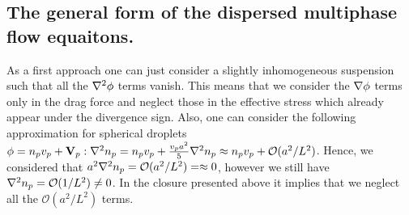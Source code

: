 \subsection{The general form of the dispersed multiphase flow equaitons.}

As a first approach one can just consider a slightly inhomogeneous suspension such that all the $\mathbf{\nabla}^2 \phi$ terms vanish. 
This means that we consider the $\mathbf{\nabla} \phi$ terms only in the drag force and neglect those in the effective stress which already appear under the divergence sign. 
Also, one can consider the following approximation for spherical droplets $\phi = n_pv_p + \textbf{V}_p :\mathbf{\nabla}^2 n_p = n_pv_p + \frac{v_p a^2}{5}\mathbf{\nabla}^2 n_p \approx n_pv_p + \mathcal{O}(a^2/L^2)$.
Hence, we considered that $a^2\mathbf{\nabla}^2 n_p=\mathcal{O}(a^2/L^2)=\approx 0$, however we still have $\mathbf{\nabla}^2 n_p =\mathcal{O}(1/L^2) \neq 0$. 
In the closure presented above it implies that we neglect all the $\mathcal{O}(a^2/L^2)$ terms. 

